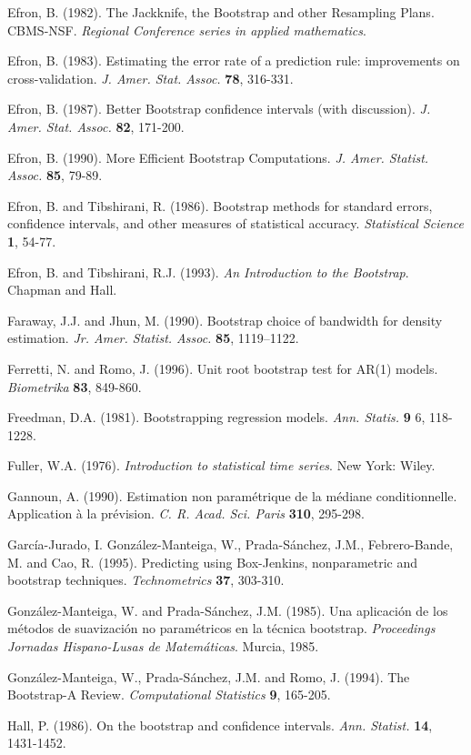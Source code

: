 \documentclass[]{book}
\theoremstyle{definition}
\theoremstyle{definition}
\theoremstyle{definition}
\theoremstyle{remark}
\begin{document}
Efron, B. (1982). The Jackknife, the Bootstrap and other Resampling
Plans. CBMS-NSF. \emph{Regional Conference series in applied
mathematics}.

Efron, B. (1983). Estimating the error rate of a prediction rule:
improvements on cross-validation. \emph{J. Amer. Stat. Assoc.}
\textbf{78}, 316-331.

Efron, B. (1987). Better Bootstrap confidence intervals (with
discussion). \emph{J. Amer. Stat. Assoc.} \textbf{82}, 171-200.

Efron, B. (1990). More Efficient Bootstrap Computations. \emph{J. Amer.
Statist. Assoc.} \textbf{85}, 79-89.

Efron, B. and Tibshirani, R. (1986). Bootstrap methods for standard
errors, confidence intervals, and other measures of statistical
accuracy. \emph{Statistical Science} \textbf{1}, 54-77.

Efron, B. and Tibshirani, R.J. (1993). \emph{An Introduction to the
Bootstrap}. Chapman and Hall.

Faraway, J.J. and Jhun, M. (1990). Bootstrap choice of bandwidth for
density estimation. \emph{Jr. Amer. Statist. Assoc.} \textbf{85},
1119--1122.

Ferretti, N. and Romo, J. (1996). Unit root bootstrap test for AR(1)
models. \emph{Biometrika} \textbf{83}, 849-860.

Freedman, D.A. (1981). Bootstrapping regression models. \emph{Ann.
Statis.} \textbf{9} 6, 118-1228.

Fuller, W.A. (1976). \emph{Introduction to statistical time series}. New
York: Wiley.

Gannoun, A. (1990). Estimation non paramétrique de la médiane
conditionnelle. Application à la prévision. \emph{C. R. Acad. Sci.
Paris} \textbf{310}, 295-298.

García-Jurado, I. González-Manteiga, W., Prada-Sánchez, J.M.,
Febrero-Bande, M. and Cao, R. (1995). Predicting using Box-Jenkins,
nonparametric and bootstrap techniques. \emph{Technometrics}
\textbf{37}, 303-310.

González-Manteiga, W. and Prada-Sánchez, J.M. (1985). Una aplicación de
los métodos de suavización no paramétricos en la técnica bootstrap.
\emph{Proceedings Jornadas Hispano-Lusas de Matemáticas}. Murcia, 1985.

González-Manteiga, W., Prada-Sánchez, J.M. and Romo, J. (1994). The
Bootstrap-A Review. \emph{Computational Statistics} \textbf{9}, 165-205.

Hall, P. (1986). On the bootstrap and confidence intervals. \emph{Ann.
Statist.} \textbf{14}, 1431-1452.
\end{document}
